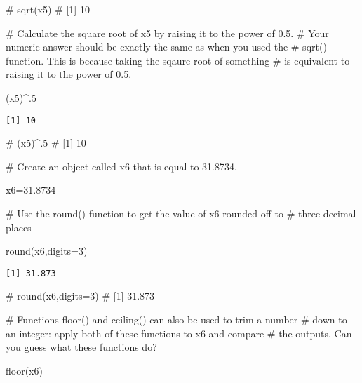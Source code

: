 \documentclass[
  letterpaper,
  DIV=11,
  numbers=noendperiod]{scrartcl}
\newenvironment{Shaded}{\begin{snugshade}}{\end{snugshade}}
\newcommand{\AttributeTok}[1]{\textcolor[rgb]{0.40,0.45,0.13}{#1}}
\newcommand{\CommentTok}[1]{\textcolor[rgb]{0.37,0.37,0.37}{#1}}
\newcommand{\DecValTok}[1]{\textcolor[rgb]{0.68,0.00,0.00}{#1}}
\newcommand{\FloatTok}[1]{\textcolor[rgb]{0.68,0.00,0.00}{#1}}
\newcommand{\FunctionTok}[1]{\textcolor[rgb]{0.28,0.35,0.67}{#1}}
\newcommand{\NormalTok}[1]{\textcolor[rgb]{0.00,0.23,0.31}{#1}}
\newcommand{\OtherTok}[1]{\textcolor[rgb]{0.00,0.23,0.31}{#1}}
\newcommand{\SpecialCharTok}[1]{\textcolor[rgb]{0.37,0.37,0.37}{#1}}
\begin{document}
\begin{Shaded}
\begin{Highlighting}[]
\CommentTok{\# sqrt(x5)}
\CommentTok{\# [1] 10}

\CommentTok{\# Calculate the square root of x5 by raising it to the power of 0.5. }
\CommentTok{\# Your numeric answer should be exactly the same as when you used the }
\CommentTok{\# sqrt() function. This is because taking the sqaure root of something }
\CommentTok{\# is equivalent to raising it to the power of 0.5. }

\NormalTok{(x5)}\SpecialCharTok{\^{}}\NormalTok{.}\DecValTok{5}
\end{Highlighting}
\end{Shaded}

\begin{verbatim}
[1] 10
\end{verbatim}

\begin{Shaded}
\begin{Highlighting}[]
\CommentTok{\# (x5)\^{}.5}
\CommentTok{\# [1] 10}


\CommentTok{\# Create an object called x6 that is equal to 31.8734.}


\NormalTok{x6}\OtherTok{=}\FloatTok{31.8734}


\CommentTok{\# Use the round() function to get the value of x6 rounded off to }
\CommentTok{\# three decimal places}


\FunctionTok{round}\NormalTok{(x6,}\AttributeTok{digits=}\DecValTok{3}\NormalTok{)}
\end{Highlighting}
\end{Shaded}

\begin{verbatim}
[1] 31.873
\end{verbatim}

\begin{Shaded}
\begin{Highlighting}[]
\CommentTok{\# round(x6,digits=3)}
\CommentTok{\# [1] 31.873}

\CommentTok{\# Functions floor() and ceiling() can also be used to trim a number}
\CommentTok{\# down to an integer: apply both of these functions to x6 and compare}
\CommentTok{\# the outputs. Can you guess what these functions do? }


\FunctionTok{floor}\NormalTok{(x6)}
\end{Highlighting}
\end{Shaded}
\end{document}
